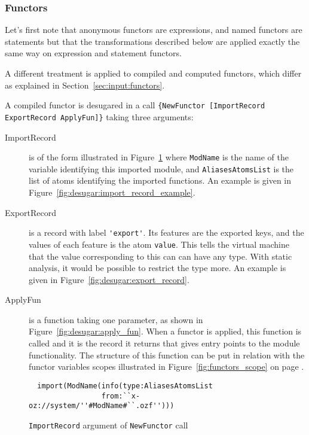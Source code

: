 \documentclass[a4paper]{memoir}
\begin{document}
\subsubsection{Functors}\label{sec:arch:desugar:functors}
Let's first note that anonymous functors are expressions, and named functors are
statements but that the transformations described below are applied exactly the same way
on expression and statement functors.

A different treatment is applied to compiled and computed functors, which differ
as explained in Section~\ref{sec:input:functors}.

A compiled functor is desugared in a call \lstinline!{NewFunctor [ImportRecord ExportRecord ApplyFun]}! taking three
arguments:
\begin{description}
  \item[ImportRecord] is of the form  illustrated in
    Figure~\ref{fig:desugar:import_record}
    where \lstinline!ModName! is the name
    of the variable identifying this imported module, and
    \lstinline!AliasesAtomsList! is the list of atoms identifying the imported
    functions. An example is given in Figure~\ref{fig:desugar:import_record_example}.
  \item[ExportRecord] is a record with label \lstinline!'export'!. Its features are the
    exported keys, and the values of each feature is the atom \lstinline!value!.
    This tells the virtual machine that the value corresponding to this can can
    have any type. With static analysis, it would be possible to restrict the
    type more. An example is given in Figure~\ref{fig:desugar:export_record}.
  \item[ApplyFun] is a function taking one parameter, as shown in
    Figure~\ref{fig:desugar:apply_fun}. When a functor is applied, this function is called
    and it is the record it returns that gives entry points to the module
    functionality. The structure of this function can be put in relation with
    the functor variables scopes illustrated in Figure~\ref{fig:functors_scope}
    on page \pageref{fig:functors_scope}.
\end{description}

\begin{figure}[ht]
\begin{lstlisting}
  import(ModName(info(type:AliasesAtomsList 
                 from:``x-oz://system/''#ModName#``.ozf''))) 
\end{lstlisting}
\caption{\lstinline!ImportRecord! argument of \lstinline!NewFunctor! call}
\label{fig:desugar:import_record}
\end{figure}
\end{document}
